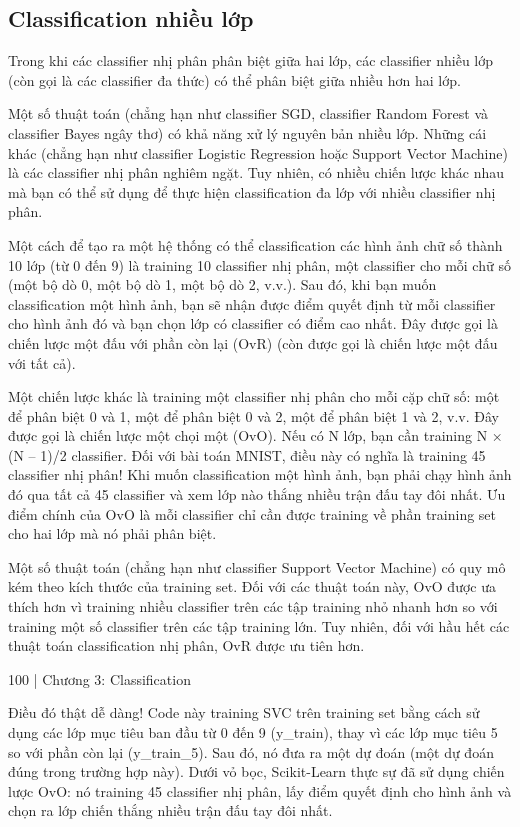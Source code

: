\subsection{Classification nhiều lớp}

Trong khi các classifier nhị phân phân biệt giữa hai lớp, các classifier nhiều lớp (còn gọi là các classifier đa thức) có thể phân biệt giữa nhiều hơn hai lớp.

Một số thuật toán (chẳng hạn như classifier SGD, classifier Random Forest và classifier Bayes ngây thơ) có khả năng xử lý nguyên bản nhiều lớp. Những cái khác (chẳng hạn như classifier Logistic Regression hoặc Support Vector Machine) là các classifier nhị phân nghiêm ngặt. Tuy nhiên, có nhiều chiến lược khác nhau mà bạn có thể sử dụng để thực hiện classification đa lớp với nhiều classifier nhị phân.

Một cách để tạo ra một hệ thống có thể classification các hình ảnh chữ số thành 10 lớp (từ 0 đến 9) là training 10 classifier nhị phân, một classifier cho mỗi chữ số (một bộ dò 0, một bộ dò 1, một bộ dò 2, v.v.). Sau đó, khi bạn muốn classification một hình ảnh, bạn sẽ nhận được điểm quyết định từ mỗi classifier cho hình ảnh đó và bạn chọn lớp có classifier có điểm cao nhất. Đây được gọi là chiến lược một đấu với phần còn lại (OvR) (còn được gọi là chiến lược một đấu với tất cả).

Một chiến lược khác là training một classifier nhị phân cho mỗi cặp chữ số: một để phân biệt 0 và 1, một để phân biệt 0 và 2, một để phân biệt 1 và 2, v.v. Đây được gọi là chiến lược một chọi một (OvO). Nếu có N lớp, bạn cần training N × (N – 1)/2 classifier. Đối với bài toán MNIST, điều này có nghĩa là training 45 classifier nhị phân! Khi muốn classification một hình ảnh, bạn phải chạy hình ảnh đó qua tất cả 45 classifier và xem lớp nào thắng nhiều trận đấu tay đôi nhất. Ưu điểm chính của OvO là mỗi classifier chỉ cần được training về phần training set cho hai lớp mà nó phải phân biệt.

Một số thuật toán (chẳng hạn như classifier Support Vector Machine) có quy mô kém theo kích thước của training set. Đối với các thuật toán này, OvO được ưa thích hơn vì training nhiều classifier trên các tập training nhỏ nhanh hơn so với training một số classifier trên các tập training lớn. Tuy nhiên, đối với hầu hết các thuật toán classification nhị phân, OvR được ưu tiên hơn.

100 | Chương 3: Classification

Điều đó thật dễ dàng! Code này training SVC trên training set bằng cách sử dụng các lớp mục tiêu ban đầu từ 0 đến 9 (y\_train), thay vì các lớp mục tiêu 5 so với phần còn lại (y\_train\_5). Sau đó, nó đưa ra một dự đoán (một dự đoán đúng trong trường hợp này). Dưới vỏ bọc, Scikit-Learn thực sự đã sử dụng chiến lược OvO: nó training 45 classifier nhị phân, lấy điểm quyết định cho hình ảnh và chọn ra lớp chiến thắng nhiều trận đấu tay đôi nhất.

